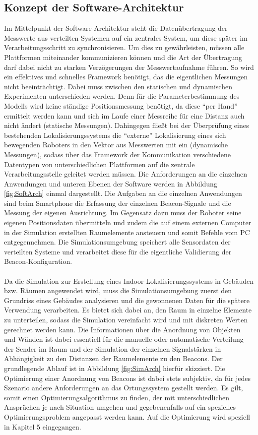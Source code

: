 \subsection{Konzept der Software-Architektur}\label{sec:KonSofArch}
Im Mittelpunkt der Software-Architektur steht die Datenübertragung der Messwerte aus verteilten Systemen auf ein zentrales System, um diese später im Verarbeitungsschritt zu synchronisieren. Um dies zu gewährleisten, müssen alle Plattformen miteinander kommunizieren können und die Art der Übertragung darf dabei nicht zu starken Verzögerungen der Messwertaufnahme führen. So wird ein effektives und schnelles Framework benötigt, das die eigentlichen Messungen nicht beeinträchtigt. Dabei muss zwischen den statischen und dynamischen Experimenten unterschieden werden. Denn für die Parameterbestimmung des Modells wird keine ständige Positionsmessung benötigt, da diese "`per Hand"' ermittelt werden kann und sich im Laufe einer Messreihe für eine Distanz auch nicht ändert (statische Messungen). Dahingegen fließt bei der Überprüfung eines bestehenden Lokalisierungssystems die "`externe"' Lokalisierung eines sich bewegenden Roboters in den Vektor aus Messwerten mit ein (dynamische Messungen), sodass über das Framework der Kommunikation verschiedene Datentypen von unterschiedlichen Plattformen auf die zentrale Verarbeitungsstelle geleitet werden müssen. Die Anforderungen an die einzelnen Anwendungen und unteren Ebenen der Software werden in Abbildung \ref{fig:SoftArch} einmal dargestellt. Die Aufgaben an die einzelnen Anwendungen sind beim Smartphone die Erfassung der einzelnen Beacon-Signale und die Messung der eigenen Ausrichtung. Im Gegensatz dazu muss der Roboter seine eigenen Positionsdaten übermitteln und zudem die auf einem externen Computer in der Simulation erstellten Raumelemente ansteuern und somit Befehle vom PC entgegennehmen. Die Simulationsumgebung speichert alle Sensordaten der verteilten Systeme und verarbeitet diese für die eigentliche Validierung der Beacon-Konfiguration. \\ \\
Da die Simulation zur Erstellung eines Indoor-Lokalisierungssystems in Gebäuden bzw. Räumen angewendet wird, muss die Simulationsumgebung zuerst den Grundriss eines Gebäudes analysieren und die gewonnenen Daten für die spätere Verwendung verarbeiten. Es bietet sich dabei an, den Raum in einzelne Elemente zu unterteilen, sodass die Simulation vereinfacht wird und mit diskreten Werten gerechnet werden kann. Die Informationen über die Anordnung von Objekten und Wänden ist dabei essentiell für die manuelle oder automatische Verteilung der Sender im Raum und der Simulation der einzelnen Signalstärken in Abhängigkeit zu den Distanzen der Raumelemente zu den Beacons. Der grundlegende Ablauf ist in Abbildung \ref{fig:SimArch} hierfür skizziert. Die Optimierung einer Anordnung von Beacons ist dabei stets subjektiv, da für jedes Szenario andere Anforderungen an das Ortungssystem gestellt werden. Es gilt, somit einen Optimierungsalgorithmus zu finden, der mit unterschiedlichen Ansprüchen je nach Situation umgehen und gegebenenfalls auf ein spezielles Optimierungsproblem angepasst werden kann. Auf die Optimierung wird speziell in Kapitel 5 eingegangen.
